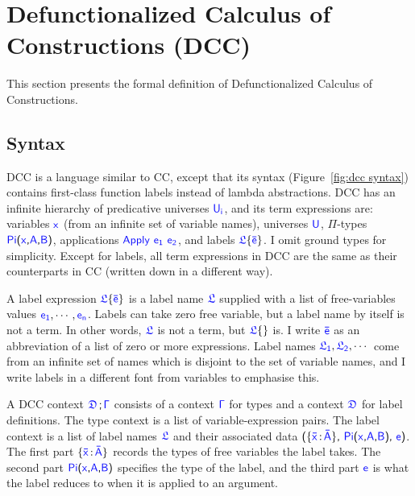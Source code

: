 
\section{Defunctionalized Calculus of\\Constructions (DCC)}

This section presents the formal definition of Defunctionalized Calculus of Constructions.

\subsection{Syntax}
DCC is a language similar to CC, except that its syntax (Figure~\ref{fig:dcc syntax}) contains first-class function labels instead of lambda abstractions.
DCC has an infinite hierarchy of predicative universes $\target{U_i}$, and its term expressions are: variables $\target{x}$ (from an infinite set of variable names), universes $\target{U}$, $\Pi$-types $\targetpi{x}{A}{B}$, applications $\targetapp{e_1}{e_2}$, and labels $\targetlab{\flabel}{\bar{e}}$. I omit ground types for simplicity. Except for labels, all term expressions in DCC are the same as their counterparts in CC (written down in a different way).

A label expression $\targetlab{\flabel}{\bar{e}}$ is a label name $\target{\flabel}$ supplied with a list of free-variables values $\target{e_1}, \cdots, \target{e_n}$. Labels can take zero free variable, but a label name by itself is not a term. In other words, $\target{\flabel}$ is not a term, but $\targetlab{\flabel}{}$ is. I write $\target{\bar{e}}$ as an abbreviation of a list of zero or more expressions. Label names $\target{\flabel_1}, \target{\flabel_2}, \cdots$ come from an infinite set of names which is disjoint to the set of variable names, and I write labels in a different font from variables to emphasise this.

A DCC context $\targetcon$ consists of a context $\target{\Gamma}$ for types and a context $\target{\fdef}$ for label definitions. The type context is a list of variable-expression pairs. The label context is a list of label names $\target{\flabel}$ and their associated data 
$\textsf{(}\{\itemtype{\bar{x}}{\bar{A}}\}\textsf{,}\ \targetpi{x}{A}{B} \textsf{,}\ \target{e} \textsf{)}$. 
The first part $\{\itemtype{\bar{x}}{\bar{A}}\}$ records the types of free variables the label takes. 
The second part $\targetpi{x}{A}{B}$ specifies the type of the label, and the third part $\target{e}$ is what the label reduces to when it is applied to an argument.

